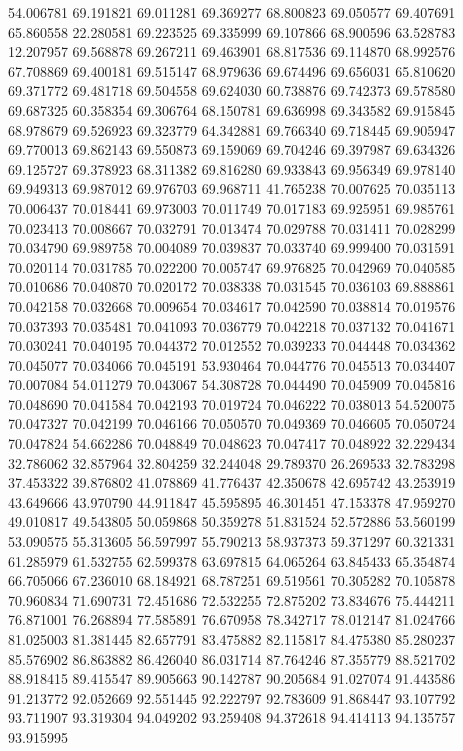 54.006781
69.191821
69.011281
69.369277
68.800823
69.050577
69.407691
65.860558
22.280581
69.223525
69.335999
69.107866
68.900596
63.528783
12.207957
69.568878
69.267211
69.463901
68.817536
69.114870
68.992576
67.708869
69.400181
69.515147
68.979636
69.674496
69.656031
65.810620
69.371772
69.481718
69.504558
69.624030
60.738876
69.742373
69.578580
69.687325
60.358354
69.306764
68.150781
69.636998
69.343582
69.915845
68.978679
69.526923
69.323779
64.342881
69.766340
69.718445
69.905947
69.770013
69.862143
69.550873
69.159069
69.704246
69.397987
69.634326
69.125727
69.378923
68.311382
69.816280
69.933843
69.956349
69.978140
69.949313
69.987012
69.976703
69.968711
41.765238
70.007625
70.035113
70.006437
70.018441
69.973003
70.011749
70.017183
69.925951
69.985761
70.023413
70.008667
70.032791
70.013474
70.029788
70.031411
70.028299
70.034790
69.989758
70.004089
70.039837
70.033740
69.999400
70.031591
70.020114
70.031785
70.022200
70.005747
69.976825
70.042969
70.040585
70.010686
70.040870
70.020172
70.038338
70.031545
70.036103
69.888861
70.042158
70.032668
70.009654
70.034617
70.042590
70.038814
70.019576
70.037393
70.035481
70.041093
70.036779
70.042218
70.037132
70.041671
70.030241
70.040195
70.044372
70.012552
70.039233
70.044448
70.034362
70.045077
70.034066
70.045191
53.930464
70.044776
70.045513
70.034407
70.007084
54.011279
70.043067
54.308728
70.044490
70.045909
70.045816
70.048690
70.041584
70.042193
70.019724
70.046222
70.038013
54.520075
70.047327
70.042199
70.046166
70.050570
70.049369
70.046605
70.050724
70.047824
54.662286
70.048849
70.048623
70.047417
70.048922
32.229434
32.786062
32.857964
32.804259
32.244048
29.789370
26.269533
32.783298
37.453322
39.876802
41.078869
41.776437
42.350678
42.695742
43.253919
43.649666
43.970790
44.911847
45.595895
46.301451
47.153378
47.959270
49.010817
49.543805
50.059868
50.359278
51.831524
52.572886
53.560199
53.090575
55.313605
56.597997
55.790213
58.937373
59.371297
60.321331
61.285979
61.532755
62.599378
63.697815
64.065264
63.845433
65.354874
66.705066
67.236010
68.184921
68.787251
69.519561
70.305282
70.105878
70.960834
71.690731
72.451686
72.532255
72.875202
73.834676
75.444211
76.871001
76.268894
77.585891
76.670958
78.342717
78.012147
81.024766
81.025003
81.381445
82.657791
83.475882
82.115817
84.475380
85.280237
85.576902
86.863882
86.426040
86.031714
87.764246
87.355779
88.521702
88.918415
89.415547
89.905663
90.142787
90.205684
91.027074
91.443586
91.213772
92.052669
92.551445
92.222797
92.783609
91.868447
93.107792
93.711907
93.319304
94.049202
93.259408
94.372618
94.414113
94.135757
93.915995
